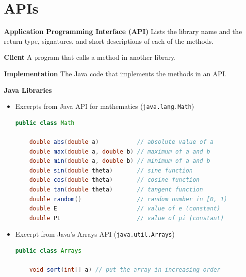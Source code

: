 \documentclass[8pt,a4paper,compress]{beamer}
\begin{document}
\section{APIs}
\begin{frame}[fragile]
\pause
\textbf{Application Programming Interface (API)} Lists the library name and the return type, signatures, and short descriptions of each of the methods. 

\pause
\smallskip

\textbf{Client} A program that calls a method in another library.

\pause
\smallskip

\textbf{Implementation} The Java code that implements the methods in an API.

\pause
\smallskip

\textbf{Java Libraries}
\begin{itemize}
\item Excerpts from Java API for mathematics (\lstinline$java.lang.Math$)
\begin{lstlisting}[language=Java]
public class Math

    double abs(double a)           // absolute value of a
    double max(double a, double b) // maximum of a and b
    double min(double a, double b) // minimum of a and b
    double sin(double theta)       // sine function
    double cos(double theta)       // cosine function
    double tan(double theta)       // tangent function
    double random()                // random number in [0, 1)
    double E                       // value of e (constant)
    double PI                      // value of pi (constant)
\end{lstlisting}

\item Excerpt from Java's Arrays API (\lstinline$java.util.Arrays$)
\begin{lstlisting}[language=Java]
public class Arrays

    void sort(int[] a) // put the array in increasing order
\end{lstlisting}
\end{itemize}

\end{frame}
\end{document}
